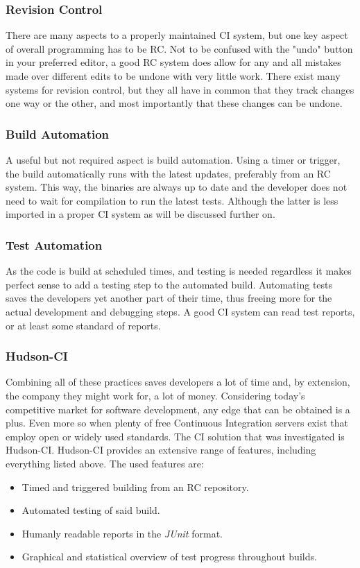 \documentclass[11pt,british]{article}
\begin{document}
\subsubsection{Revision Control}
There are many aspects to a properly maintained \gls{CI} system, but one key aspect of overall programming has to be \gls{RC}. Not to be confused with the "undo" button in your preferred editor, a good \gls{RC} system does allow for any and all mistakes made over different edits to be undone with very little work. There exist many systems for revision control, but they all have in common that they track changes one way or the other, and most importantly that these changes can be undone. 

\subsubsection{Build Automation}
A useful but not required aspect is build automation. Using a timer or trigger, the build automatically runs with the latest updates, preferably from an \gls{RC} system. This way, the binaries are always up to date and the developer does not need to wait for compilation to run the latest tests. Although the latter is less imported in a proper \gls{CI} system as will be discussed further on. 

\subsubsection{Test Automation}
As the code is build at scheduled times, and testing is needed regardless it makes perfect sense to add a testing step to the automated build. Automating tests saves the developers yet another part of their time, thus freeing more for the actual development and debugging steps. A good \gls{CI} system can read test reports, or at least some standard of reports. 

\subsubsection{Hudson-CI}
Combining all of these practices saves developers a lot of time and, by extension, the company they might work for, a lot of money. Considering today's competitive market for software development, any edge that can be obtained is a plus. Even more so when plenty of free Continuous Integration servers exist that employ open or widely used standards. The \gls{CI} solution that was investigated is Hudson-CI. Hudson-CI provides an extensive range of features, including everything listed above. The used features are:
\begin{itemize}
\item Timed and triggered building from an \gls{RC} repository.
\item Automated testing of said build.
\item Humanly readable reports in the \emph{JUnit} format.
\item Graphical and statistical overview of test progress throughout builds.
\end{itemize}
\end{document}
